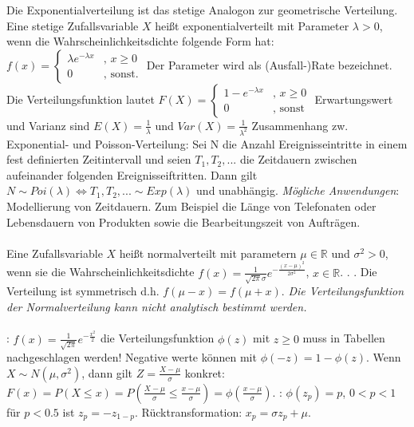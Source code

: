 Die Exponentialverteilung ist das stetige Analogon zur geometrische Verteilung. Eine stetige Zufallsvariable $X$ heißt exponentialverteilt mit Parameter $\lambda > 0$, wenn die Wahrscheinlichkeitsdichte folgende Form hat: $f(x) = \begin{cases}
    \lambda e^{-\lambda x} & \text{, } x \ge 0\\
    0 & \text{, sonst.}
\end{cases}$ Der Parameter \hlc{$\lambda$} wird als (Ausfall-)Rate bezeichnet. Die Verteilungsfunktion lautet $F(X) = \begin{cases}
    1 - e^{-\lambda x} & \text{, } x \ge 0\\
    0 & \text{, sonst}
\end{cases}$ Erwartungswert und Varianz sind $E(X) = \frac{1}{\lambda}$ und $Var(X) = \frac{1}{\lambda^2}$
Zusammenhang zw. Exponential- und Poisson-Verteilung: Sei N die Anzahl Ereignisseintritte in einem fest definierten Zeitintervall und seien $T_1, T_2, ...$ die Zeitdauern zwischen aufeinander folgenden Ereignisseiftritten. Dann gilt $N \sim Poi(\lambda) \Leftrightarrow T_1, T_2, ... \sim Exp(\lambda)$ und unabhängig. 
\emph{Mögliche Anwendungen}: Modellierung von Zeitdauern. Zum Beispiel die Länge von Telefonaten oder Lebensdauern von Produkten sowie die Bearbeitungszeit von Aufträgen.\\\\
 Eine Zufallsvariable $X$ heißt normalverteilt mit parametern $\mu \in \mathds{R}$ und $\sigma^2 > 0$, wenn sie die Wahrscheinlichkeitsdichte $f(x) = \frac{1}{\sqrt{2\pi}\sigma} e^{-\frac{(x - \mu)^2}{2\sigma^2}}$, $x \in \mathds{R}$. . . Die Verteilung ist symmetrisch d.h. $f(\mu - x) = f(\mu + x)$. \emph{Die Verteilungsfunktion der Normalverteilung kann nicht analytisch bestimmt werden.}\\\\
: $f(x) = \frac{1}{\sqrt{2\pi}} e^{-\frac{x^2}{2}}$ die Verteilungsfunktion $\phi(z)$ mit $z \ge 0$ muss in Tabellen nachgeschlagen werden! Negative werte können mit $\phi(-z) = 1 - \phi(z)$.  Wenn $X \sim N(\mu, \sigma^2)$, dann gilt $Z = \frac{X - \mu}{\sigma}$ konkret: $F(x) = P(X \le x) = P(\frac{X - \mu}{\sigma} \le \frac{x - \mu}{\sigma}) = \phi(\frac{x - \mu}{\sigma})$. : $\phi(z_p) = p$, $0 < p < 1$ für $p < 0.5$ ist $z_p = -z_{1-p}$. Rücktransformation: $x_p = \sigma z_p + \mu$.
